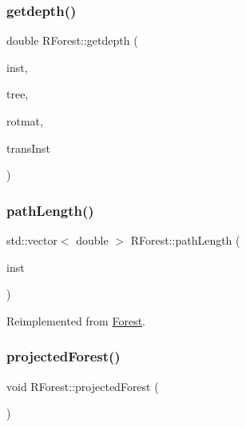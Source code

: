 \mbox{\label{classRForest_a3ecb236540eade88548b9e7ace6f13a1}} 
\subsubsection{\texorpdfstring{getdepth()}{getdepth()}}
{\footnotesize\ttfamily double R\+Forest\+::getdepth (\begin{DoxyParamCaption}\item[{double $\ast$}]{inst,  }\item[{std\+::shared\+\_\+ptr$<$ \hyperlink{classTree}{Tree} $>$}]{tree,  }\item[{Eigen\+::\+Matrix\+Xd \&}]{rotmat,  }\item[{double $\ast$}]{trans\+Inst }\end{DoxyParamCaption})}

\mbox{\label{classRForest_ad2631b9a85a04079c603b1c8296bdb9d}} 
\subsubsection{\texorpdfstring{path\+Length()}{pathLength()}}
{\footnotesize\ttfamily std\+::vector$<$ double $>$ R\+Forest\+::path\+Length (\begin{DoxyParamCaption}\item[{double $\ast$}]{inst }\end{DoxyParamCaption})\hspace{0.3cm}{\ttfamily [virtual]}}



Reimplemented from \hyperlink{classForest_a8e3bac70e9f10ce6f301e297e32e8f5a}{Forest}.

\mbox{\label{classRForest_ab6d2b335db34e4845bebf8864cc4e0e1}} 
\subsubsection{\texorpdfstring{projected\+Forest()}{projectedForest()}}
{\footnotesize\ttfamily void R\+Forest\+::projected\+Forest (\begin{DoxyParamCaption}{ }\end{DoxyParamCaption})}

